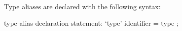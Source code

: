 Type aliases are declared with the following syntax:
\begin{syntax}
type-alias-declaration-statement:
  `type' identifier = type ;
\end{syntax}
